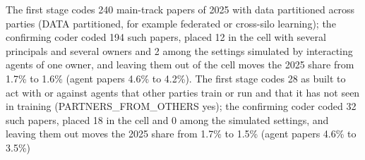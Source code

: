 The first stage codes 240 main-track papers of 2025 with data partitioned across parties (DATA partitioned, for example federated or cross-silo learning); the confirming coder coded 194 such papers, placed 12 in the cell with several principals and several owners and 2 among the settings simulated by interacting agents of one owner, and leaving them out of the cell moves the 2025 share from 1.7\% to 1.6\% (agent papers 4.6\% to 4.2\%). The first stage codes 28 as built to act with or against agents that other parties train or run and that it has not seen in training (PARTNERS\_FROM\_OTHERS yes); the confirming coder coded 32 such papers, placed 18 in the cell and 0 among the simulated settings, and leaving them out moves the 2025 share from 1.7\% to 1.5\% (agent papers 4.6\% to 3.5\%)